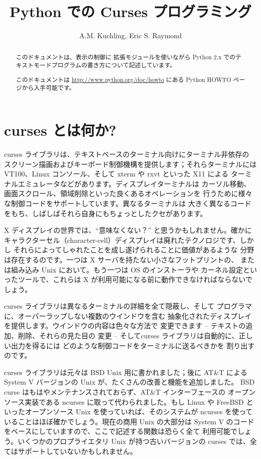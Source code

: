 \documentclass{howto}
\title{Python での Curses プログラミング}
\author{A.M. Kuchling, Eric S. Raymond}
\begin{document}
\maketitle

\begin{abstract}
\noindent
このドキュメントは、表示の制御に  拡張モジュールを使いながら
Python 2.x でのテキストモードプログラムの書き方について記述しています。

このドキュメントは \url{http://www.python.org/doc/howto} にある
Python HOWTO ページから入手可能です。
\end{abstract}

\tableofcontents

\section{curses とは何か?}

curses ライブラリは、テキストベースのターミナル向けにターミナル非依存の
スクリーン描画およびキーボード制御機構を提供します；それらターミナルには
VT100、Linux コンソール、そして xterm や rxvt といった X11 による
ターミナルエミュレータなどがあります。ディスプレイターミナルは
カーソル移動、画面スクロール、領域削除といった良くあるオペレーションを
行うために様々な制御コードをサポートしています。異なるターミナルは
大きく異なるコードをもち、しばしばそれら自身にもちょっとしたクセがあります。

X ディスプレイの世界では、``意味なくない？'' と思うかもしれません。確かに
キャラクターセル（character-cell）ディスプレイは廃れたテクノロジです、しかし
それらによってしゃれたことを成し遂げられることに価値があるような
分野は存在するのです。一つは X サーバを持たない小さなフットプリントの、
または組み込み Unix において。もう一つは OS のインストーラや
カーネル設定といったツールで、これらは X が利用可能になる前に動作できなければならないでしょう。

curses ライブラリは異なるターミナルの詳細を全て隠蔽し、そして
プログラマに、オーバーラップしない複数のウインドウを含む
抽象化されたディスプレイを提供します。ウインドウの内容は色々な方法で
変更できます -- テキストの追加、削除、それらの見た目の
変更 -- そしてcurses ライブラリは自動的に、正しい出力を得るには
どのような制御コードをターミナルに送るべきかを
割り出すのです。

curses ライブラリは元々は BSD Unix 用に書かれました；後に AT\&T による
System V バージョンの Unix が、たくさんの改善と機能を追加しました。
BSD curse はもはやメンテナンスされておらず、AT\&T インターフェースの
オープンソース実装である ncurses に取って代わられました。もし
Linux や FreeBSD といったオープンソース Unix を使っていれば、そのシステムが
ncurses を使っていることはほぼ確かでしょう。現在の商用 Unix の大部分は
System V のコードをベースにしていますので、ここで記述する関数は恐らく全て
利用可能でしょう。いくつかのプロプライエタリ Unix が持つ古いバージョンの
curses では、全てはサポートしていないかもしれません。
\end{document}
